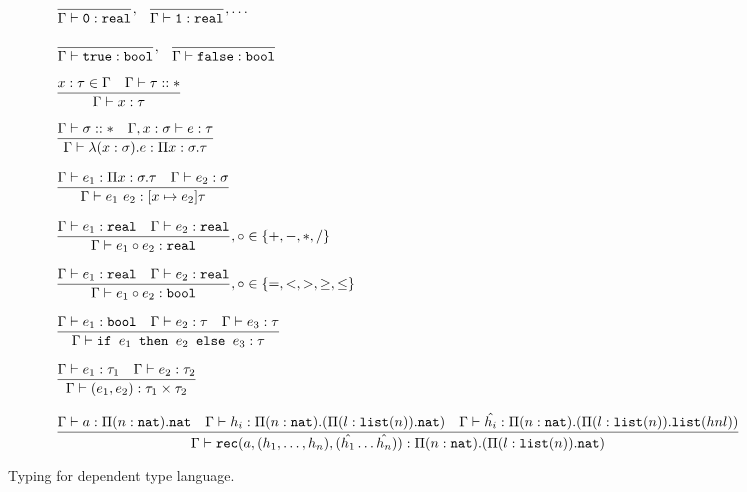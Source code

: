 \begin{figure}
\[
\begin{array}{lr}
 \\ \\
\dfrac{}{\Gamma \vdash \texttt{0}: \texttt{real}}, \ \ \dfrac{}{\Gamma \vdash \texttt{1}: \texttt{real}}, \ldots \\ \\
\dfrac{}{\Gamma \vdash \texttt{true} : \texttt{bool}}, \ \ \dfrac{}{\Gamma \vdash \texttt{false} : \texttt{bool}} \\  \\
\dfrac{x : \tau \in \Gamma \ \ \ \Gamma \vdash \tau :: *}{\Gamma \vdash x : \tau } \\ \\ 
\dfrac{\Gamma \vdash \sigma :: * \ \ \ \Gamma, x : \sigma \vdash e : \tau}
	{\Gamma \vdash \lambda (x : \sigma).e : \Pi x:\sigma.\tau } \\ \\
\dfrac{\Gamma \vdash e_1: \Pi x:\sigma.\tau \ \ \ \Gamma \vdash e_2 : \sigma}
	{\Gamma \vdash e_1 \ e_2 : [x \mapsto e_2]\tau} \\ \\
\dfrac{\Gamma \vdash e_1 : \texttt{real} \ \ \ \Gamma \vdash e_2 : \texttt{real}}
	{\Gamma \vdash e_1 \circ e_2 : \texttt{real}}
, \circ \in \{+,-,*,/\} \\ \\ 
\dfrac{\Gamma \vdash e_1 : \texttt{real} \ \ \ \Gamma \vdash e_2 : \texttt{real}}
	{\Gamma \vdash e_1 \circ e_2 : \texttt{bool}}
	, \circ \in \{=, <, >, \geq, \leq\} \\ \\ 
\dfrac{\Gamma \vdash e_1 : \texttt{bool} \ \ \ \Gamma \vdash e_2 : \tau \ \ \ \Gamma \vdash e_3 : \tau}
	{\Gamma \vdash \ifelse{e_1}{e_2}{e_3} : \tau} \\ \\ 
\dfrac{\Gamma \vdash e_1 : \tau_1 \ \ \ \Gamma \vdash e_2 : \tau_2}{\Gamma \vdash (e_1,e_2) : \tau_1 \times \tau_2}\\ \\
\dfrac{\Gamma \vdash a: \Pi (n:\texttt{nat}).\texttt{nat} \ \ \ \Gamma \vdash h_i: \Pi(n:\texttt{nat}).(\Pi (l:\lst(n)).\texttt{nat}) \ \ \ \Gamma \vdash \hat{h_i}: \Pi(n: \texttt{nat}).(\Pi(l : \lst(n)).\lst(h n l))}
	{\Gamma \vdash \texttt{rec}(a, (h_1, \ldots, h_n), (\hat{h_1} \ldots \hat{h_n})) : \Pi(n:\texttt{nat}).(\Pi (l:\lst(n)).\texttt{nat})}
\end{array}
\]
\caption{Typing for dependent type language.}
\end{figure}


